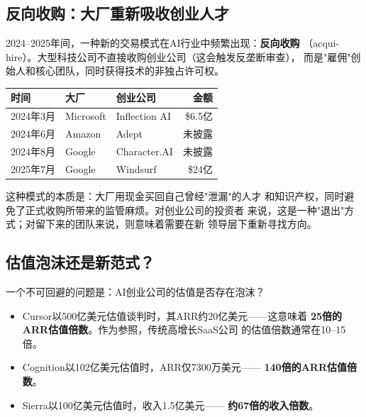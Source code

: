 \subsection{反向收购：大厂重新吸收创业人才}
\label{subsec:founders-acquihire}

2024--2025年间，一种新的交易模式在AI行业中频繁出现：\textbf{反向收购}
（acqui-hire）。大型科技公司不直接收购创业公司（这会触发反垄断审查），
而是"雇佣"创始人和核心团队，同时获得技术的非独占许可权。

\begin{keybox}[2024--2025年重大AI反向收购]
\small
\begin{tabularx}{\textwidth}{l l l r}
\toprule
\rowcolor{figLightGray}
\textbf{时间} & \textbf{大厂} & \textbf{创业公司} & \textbf{金额} \\
\midrule
2024年3月  & Microsoft   & Inflection AI    & \$6.5亿 \\
2024年6月  & Amazon      & Adept            & 未披露 \\
2024年8月  & Google      & Character.AI     & 未披露 \\
2025年7月  & Google      & Windsurf         & \$24亿 \\
\bottomrule
\end{tabularx}

\medskip
\noindent 这种模式的本质是：大厂用现金买回自己曾经"泄漏"的人才
和知识产权，同时避免了正式收购所带来的监管麻烦。对创业公司的投资者
来说，这是一种"退出"方式；对留下来的团队来说，则意味着需要在新
领导层下重新寻找方向。
\end{keybox}

\subsection{估值泡沫还是新范式？}
\label{subsec:founders-valuation}

一个不可回避的问题是：AI创业公司的估值是否存在泡沫？

\begin{itemize}
  \item Cursor以500亿美元估值谈判时，其ARR约20亿美元——这意味着
    \textbf{25倍的ARR估值倍数}。作为参照，传统高增长SaaS公司
    的估值倍数通常在10--15倍。
  \item Cognition以102亿美元估值时，ARR仅7300万美元——
    \textbf{140倍的ARR估值倍数}。
  \item Sierra以100亿美元估值时，收入1.5亿美元——
    \textbf{约67倍的收入倍数}。
\end{itemize}

